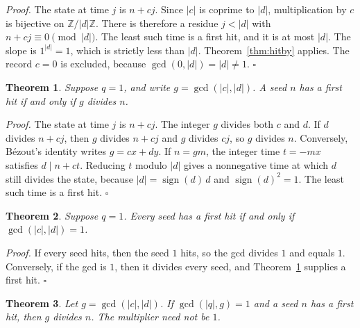 \documentclass[11pt,letterpaper]{article}
\newcommand{\Z}{\mathbb{Z}}
\newtheorem{theorem}{Theorem}
\newenvironment{proof}{\noindent\textit{Proof.}}{\hfill\(\square\)}
\begin{document}
\begin{proof}
The state at time \(j\) is \(n+cj\). Since \(\lvert c\rvert\) is coprime to \(\lvert d\rvert\), multiplication by \(c\) is bijective on \(\Z/\lvert d\rvert\Z\). There is therefore a residue \(j<\lvert d\rvert\) with \(n+cj\equiv 0\pmod{\lvert d\rvert}\). The least such time is a first hit, and it is at most \(\lvert d\rvert\). The slope is \(1^{\lvert d\rvert}=1\), which is strictly less than \(\lvert d\rvert\). Theorem~\ref{thm:hitby} applies. The record \(c=0\) is excluded, because \(\gcd(0,\lvert d\rvert)=\lvert d\rvert\ne 1\).
\end{proof}

\begin{theorem}
\label{thm:unitgcd}
Suppose \(q=1\), and write \(g=\gcd(\lvert c\rvert,\lvert d\rvert)\). A seed \(n\) has a first hit if and only if \(g\) divides \(n\).
\end{theorem}

\begin{proof}
The state at time \(j\) is \(n+cj\). The integer \(g\) divides both \(c\) and \(d\). If \(d\) divides \(n+cj\), then \(g\) divides \(n+cj\) and \(g\) divides \(cj\), so \(g\) divides \(n\). Conversely, Bézout's identity writes \(g=cx+dy\). If \(n=gm\), the integer time \(t=-mx\) satisfies \(d\mid n+ct\). Reducing \(t\) modulo \(\lvert d\rvert\) gives a nonnegative time at which \(d\) still divides the state, because \(\lvert d\rvert=\operatorname{sign}(d)\,d\) and \(\operatorname{sign}(d)^{2}=1\). The least such time is a first hit.
\end{proof}

\begin{theorem}
\label{thm:everyseed}
Suppose \(q=1\). Every seed has a first hit if and only if \(\gcd(\lvert c\rvert,\lvert d\rvert)=1\).
\end{theorem}

\begin{proof}
If every seed hits, then the seed \(1\) hits, so the gcd divides \(1\) and equals \(1\). Conversely, if the gcd is \(1\), then it divides every seed, and Theorem~\ref{thm:unitgcd} supplies a first hit.
\end{proof}

\begin{theorem}
\label{thm:gcdnec}
Let \(g=\gcd(\lvert c\rvert,\lvert d\rvert)\). If \(\gcd(\lvert q\rvert,g)=1\) and a seed \(n\) has a first hit, then \(g\) divides \(n\). The multiplier need not be \(1\).
\end{theorem}
\end{document}
